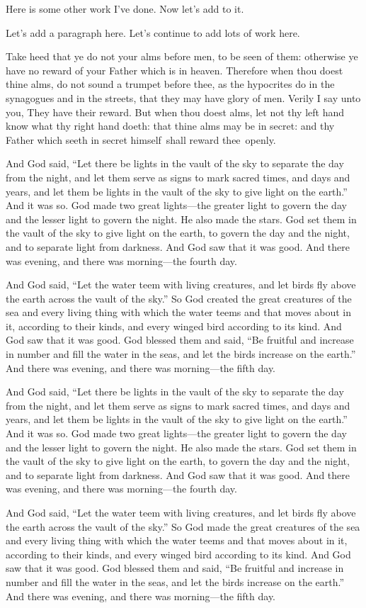 \documentclass{grattanAlpha}
\begin{document}
Here is some other work I've done. Now let's add to it. 

Let's add a paragraph here. Let's continue to add lots of work here.

Take heed that ye do not your alms before men, to be seen of them: otherwise ye have no reward of your Father which is in heaven.
Therefore when thou doest thine alms, do not sound a trumpet before thee, as the hypocrites do in the synagogues and in the streets, that they may have glory of men.
Verily I say unto you, They have their reward.  
But when thou doest alms, let not thy left hand know what thy right hand doeth: that thine alms may be in secret: and thy Father which seeth in secret himself~shall reward thee~openly.

And God said, “Let there be lights in the vault of the sky to separate the day from the night, and let them serve as signs to mark sacred times, and days and years, and let them be lights in the vault of the sky to give light on the earth.”
And it was so.
God made two great lights—the greater light to govern the day and the lesser light to govern the night.
He also made the stars.
God set them in the vault of the sky to give light on the earth, to govern the day and the night, and to separate light from darkness.
And God saw that it was good.
And there was evening, and there was morning—the fourth day.


And God said, “Let the water teem with living creatures, and let birds fly above the earth across the vault of the sky.”
So God created the great creatures of the sea and every living thing with which the water teems and that moves about in it, according to their kinds, and every winged bird according to its kind.
And God saw that it was good.
God blessed them and said, “Be fruitful and increase in number and fill the water in the seas, and let the birds increase on the earth.”
And there was evening, and there was morning—the fifth day.


And God said, “Let there be lights in the vault of the sky to separate the day from the night, and let them serve as signs to mark sacred times, and days and years, and let them be lights in the vault of the sky to give light on the earth.”
And it was so.
God made two great lights—the greater light to govern the day and the lesser light to govern the night.
He also made the stars.
God set them in the vault of the sky to give light on the earth, to govern the day and the night, and to separate light from darkness.
And God saw that it was good.
And there was evening, and there was morning—the fourth day.

And God said, “Let the water teem with living creatures, and let birds fly above the earth across the vault of the sky.”
So God made the great creatures of the sea and every living thing with which the water teems and that moves about in it, according to their kinds, and every winged bird according to its kind.
And God saw that it was good.
God blessed them and said, “Be fruitful and increase in number and fill the water in the seas, and let the birds increase on the earth.”
And there was evening, and there was morning—the fifth day.
\end{document}
